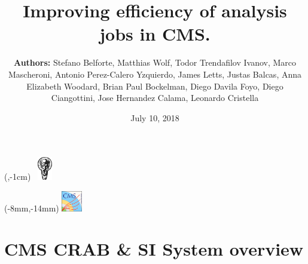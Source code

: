 \documentclass[8pt,mathserif,a4paper,oneside,pdf]{beamer}
\begin{document}

\date{ July 10, 2018}
\title[Improving efficiency of analysis jobs in CMS | CHEP2018]{Improving efficiency of analysis jobs in CMS. \\}
\author[Todor Trendafilov Ivanov, University of Sofia ``St. Kliment Ohridski'']{
  \textbf{Authors:} Stefano Belforte, Matthias Wolf, Todor Trendafilov Ivanov, Marco Mascheroni, Antonio Perez-Calero Yzquierdo, James Letts, Justas Balcas, Anna Elizabeth Woodard, Brian Paul Bockelman, Diego Davila Foyo, Diego Ciangottini, Jose Hernandez Calama, Leonardo Cristella \\
}


\begin{frame}{}

\begin{textblock*}{100mm}(\textwidth,-1cm)
    \includegraphics[height=1cm,width=1cm,keepaspectratio]{images/logo_su}
\end{textblock*}

\begin{textblock*}{100mm}(-8mm,-14mm)
    \includegraphics[height=9mm,width=9mm,keepaspectratio]{images/logo_CMS}
\end{textblock*}

  \begin{minipage}[t]{1\textwidth}
    \begin{center}
      \vspace{-1cm}
    \end{center}
  \end{minipage}
 \noindent\makebox[\linewidth]{\rule{\paperwidth}{1pt}}
 \titlepage

 \vfill

\end{frame}


\section[CMS CRAB \& SI System overview]{CMS CRAB \& SI System overview}
\end{document}
